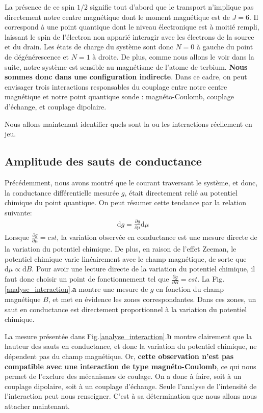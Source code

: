 La présence de ce spin $1/2$ signifie tout d'abord que le transport n'implique pas directement notre centre magnétique dont le moment magnétique est de $J=6$. Il correspond à une point quantique dont le niveau électronique est à moitié rempli, laissant le spin de l'électron non apparié interagir avec les électrons de la source et du drain. Les états de charge du système sont donc $N=0$ à gauche du point de dégénérescence et $N=1$ à droite. De plus, comme nous allons le voir dans la suite, notre système est sensible au magnétisme de l'atome de terbium. \textbf{Nous sommes donc dans une configuration indirecte}. Dans ce cadre, on peut envisager trois interactions responsables du couplage entre notre centre magnétique et notre point quantique sonde : magnéto-Coulomb, couplage d'échange, et couplage dipolaire.

Nous allons maintenant identifier quels sont la ou les interactions réellement en jeu.

\subsection{Amplitude des sauts de conductance}
Précédemment, nous avons montré que le courant traversant le système, et donc, la conductance différentielle mesurée $g$, était directement relié au potentiel chimique du point quantique. On peut résumer cette tendance par la relation suivante:
\begin{eqnarray}
\text{d}g = \frac{\partial g}{\partial \mu} \text{d} \mu
\end{eqnarray}
Lorsque $\frac{\partial g}{\partial \mu} = cst$, la variation observée en conductance est une mesure directe de la variation du potentiel chimique. De plus, en raison de l'effet Zeeman, le potentiel chimique varie linéairement avec le champ magnétique, de sorte que $\text{d}\mu \propto \text{d}B$. Pour avoir une lecture directe de la variation du potentiel chimique, il faut donc choisir un point de fonctionnement tel que $\frac{\partial g}{\partial B} = cst$. La Fig.\ref{analyse_interaction}.\textbf{a} montre une mesure de $g$ en fonction du champ magnétique $B$, et met en évidence les zones correspondantes. Dans ces zones, un saut en conductance est directement proportionnel à la variation du potentiel chimique. 

La mesure présentée dans Fig.\ref{analyse_interaction}.\textbf{b} montre clairement que la hauteur des sauts en conductance, et donc la variation du potentiel chimique, ne dépendent pas du champ magnétique. Or, \textbf{cette observation n'est pas compatible avec une interaction de type magnéto-Coulomb}, ce qui nous permet de l'exclure des mécanismes de coulage. On a donc à faire, soit à un couplage dipolaire, soit à un couplage d'échange. Seule l'analyse de l'intensité de l'interaction peut nous renseigner. C'est à sa détermination que nous allons nous attacher maintenant.

